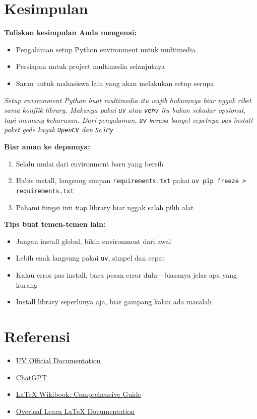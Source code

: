 \documentclass[11pt,a4paper]{article}
\begin{document}
\section{Kesimpulan}
\textbf{Tuliskan kesimpulan Anda mengenai:}
\begin{itemize}
    \item Pengalaman setup Python environment untuk multimedia
    \item Persiapan untuk project multimedia selanjutnya
    \item Saran untuk mahasiswa lain yang akan melakukan setup serupa
\end{itemize}

\textit{
Setup environment Python buat multimedia itu wajib hukumnya biar nggak ribet sama konflik library. Makanya pakai \texttt{uv} atau \texttt{venv} itu bukan sekadar opsional, tapi memang keharusan. Dari pengalaman, \texttt{uv} kerasa banget cepetnya pas install paket gede kayak \texttt{OpenCV} dan \texttt{SciPy}}

\textbf{Biar aman ke depannya:}
\begin{enumerate}
    \item Selalu mulai dari environment baru yang bersih
    \item Habis install, langsung simpan \texttt{requirements.txt} pakai \texttt{uv pip freeze > requirements.txt}
    \item Pahami fungsi inti tiap library biar nggak salah pilih alat
\end{enumerate}

\textbf{Tips buat temen-temen lain:}
\begin{itemize}
    \item Jangan install global, bikin environment dari awal
    \item Lebih enak langsung pakai \texttt{uv}, simpel dan cepat
    \item Kalau error pas install, baca pesan error dulu—biasanya jelas apa yang kurang
    \item Install library seperlunya aja, biar gampang kalau ada masalah
\end{itemize}



\section{Referensi}
\begin{itemize}
    \item \href{https://docs.astral.sh/uv/}{UV Official Documentation}
    \item \href{https://chatgpt.com/share/68adcaac-f580-8006-bc89-1113529dff4d}{ChatGPT}
    \item \href{https://en.wikibooks.org/wiki/LaTeX}{LaTeX Wikibook: Comprehensive Guide}
    \item \href{https://www.overleaf.com/learn}{Overleaf Learn LaTeX Documentation}
\end{itemize}
\end{document}

